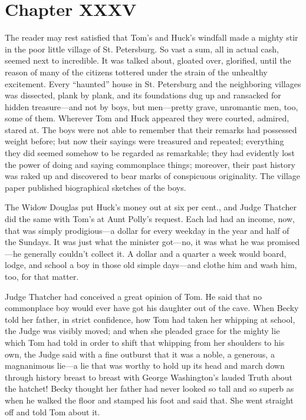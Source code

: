 \documentclass{book}
\begin{document}
\chapter*{Chapter XXXV}

The reader may rest satisfied that Tom’s and Huck’s windfall made a mighty stir in the poor little village of St. Petersburg. So vast a sum, all in actual cash, seemed next to incredible. It was talked about, gloated over, glorified, until the reason of many of the citizens tottered under the strain of the unhealthy excitement. Every “haunted” house in St. Petersburg and the neighboring villages was dissected, plank by plank, and its foundations dug up and ransacked for hidden treasure—and not by boys, but men—pretty grave, unromantic men, too, some of them. Wherever Tom and Huck appeared they were courted, admired, stared at. The boys were not able to remember that their remarks had possessed weight before; but now their sayings were treasured and repeated; everything they did seemed somehow to be regarded as remarkable; they had evidently lost the power of doing and saying commonplace things; moreover, their past history was raked up and discovered to bear marks of conspicuous originality. The village paper published biographical sketches of the boys.

The Widow Douglas put Huck’s money out at six per cent., and Judge Thatcher did the same with Tom’s at Aunt Polly’s request. Each lad had an income, now, that was simply prodigious—a dollar for every weekday in the year and half of the Sundays. It was just what the minister got—no, it was what he was promised—he generally couldn’t collect it. A dollar and a quarter a week would board, lodge, and school a boy in those old simple days—and clothe him and wash him, too, for that matter.

Judge Thatcher had conceived a great opinion of Tom. He said that no commonplace boy would ever have got his daughter out of the cave. When Becky told her father, in strict confidence, how Tom had taken her whipping at school, the Judge was visibly moved; and when she pleaded grace for the mighty lie which Tom had told in order to shift that whipping from her shoulders to his own, the Judge said with a fine outburst that it was a noble, a generous, a magnanimous lie—a lie that was worthy to hold up its head and march down through history breast to breast with George Washington’s lauded Truth about the hatchet! Becky thought her father had never looked so tall and so superb as when he walked the floor and stamped his foot and said that. She went straight off and told Tom about it.
\end{document}
